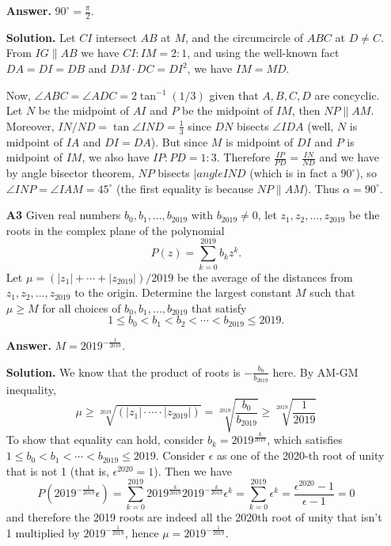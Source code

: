 \documentclass[11pt,a4paper]{article}
\newcommand{\<}{\langle}
\renewcommand{\>}{\rangle}
\begin{document}
\begin{enumerate}
	\textbf{Answer.} $90^{\circ}=\frac{\pi}{2}$. 
	
	\textbf{Solution.} Let $CI$ intersect $AB$ at $M$, and the circumcircle of $ABC$ at $D\neq C$. 
	From $IG\parallel AB$ we have $CI:IM=2:1$, and using the well-known fact $DA=DI=DB$ and 
	$DM\cdot DC=DI^2$, we have $IM=MD$. 
	
	Now, $\angle ABC=\angle ADC=2\tan^{-1}(1/3)$ given that $A, B, C, D$ are concyclic. 
	Let $N$ be the midpoint of $AI$ and $P$ be the midpoint of $IM$, then $NP\parallel AM$. 
	Moreover, $IN/ND=\tan\angle IND=\frac{1}{3}$ since $DN$ bisects $\angle IDA$ (well, $N$ is midpoint of $IA$ and $DI=DA$). 
	But since $M$ is midpoint of $DI$ and $P$ is midpoint of $IM$, we also have $IP:PD=1:3$. 
	Therefore $\frac{IP}{PD}=\frac{IN}{ND}$ and we have by angle bisector theorem, 
	$NP$ bisects $|angle IND$ (which is in fact a $90^{\circ}$), 
	so $\angle INP=\angle IAM=45^{\circ}$ (the first equality is because $NP\parallel AM$). 
	Thus $\alpha=90^{\circ}$. 
	
	\item [\textbf{A3}] Given real numbers $b_0,b_1,\ldots, b_{2019}$ with $b_{2019}\neq 0$, let $z_1,z_2,\ldots, z_{2019}$ be the roots in the complex plane of the polynomial
	\[
	P(z) = \sum_{k=0}^{2019}b_kz^k.
	\]Let $\mu = (|z_1|+ \cdots + |z_{2019}|)/2019$ be the average of the distances from $z_1,z_2,\ldots, z_{2019}$ to the origin.  Determine the largest constant $M$ such that $\mu\geq M$ for all choices of $b_0,b_1,\ldots, b_{2019}$ that satisfy
	\[
	1\leq b_0 < b_1 < b_2 < \cdots < b_{2019} \leq 2019.
	\]
	
	\textbf{Answer.} $M=2019^{-\frac{1}{2019}}$. 
	
	\textbf{Solution.} We know that the product of roots is $-\frac{b_0}{b_{2019}}$ here. By AM-GM inequality, 
	\[
	\mu\ge \sqrt[2019]{(|z_1|\cdot\cdots\cdot |z_{2019}|)}=\sqrt[2019]{\frac{b_0}{b_{2019}}}\ge \sqrt[2019]{\frac{1}{2019}}
	\]
	To show that equality can hold, consider $b_k=2019^{\frac{k}{2019}}$, which satisfies $1\le b_0<b_1<\cdots<b_{2019}\le 2019$. 
	Consider $\epsilon$ as one of the 2020-th root of unity that is not 1 (that is, $\epsilon^{2020}=1$). Then we have 
	\[
	P(2019^{-\frac{1}{2019}}\epsilon)=\sum_{k=0}^{2019}2019^{\frac{k}{2019}}2019^{-\frac{k}{2019}}\epsilon^k = \sum_{k=0}^{2019}\epsilon^k = \frac{\epsilon^{2020}-1}{\epsilon-1}=0
	\]
	and therefore the 2019 roots are indeed all the 2020th root of unity that isn't 1 multiplied by $2019^{-\frac{1}{2019}}$, hence $\mu=2019^{-\frac{1}{2019}}$. 
	

\end{enumerate}
\end{document}
